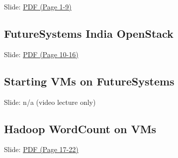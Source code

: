 
  Slide:
  \href{https://drive.google.com/open?id=0B88HKpainTSfZENxeUlOcVFUTkU}{PDF
  (Page 1-9)}

\subsection{FutureSystems India OpenStack}


  Slide:
  \href{https://drive.google.com/open?id=0B88HKpainTSfZENxeUlOcVFUTkU}{PDF
  (Page 10-16)}

\subsection{Starting VMs on FutureSystems}


  Slide: n/a (video lecture only)

\subsection{Hadoop WordCount on VMs}


  Slide:
  \href{https://drive.google.com/open?id=0B88HKpainTSfZENxeUlOcVFUTkU}{PDF
  (Page 17-22)}

